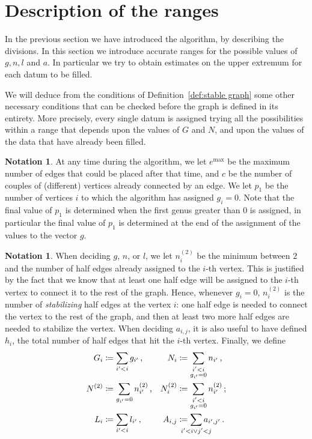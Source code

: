 \documentclass{amsart}
\theoremstyle{plain}
\theoremstyle{definition}
\newtheorem{notation}[theorem]{Notation}
\DeclareMathOperator{\MAX}{max}
\begin{document}
\section{Description of the ranges}\label{sec:ranges}

In the previous section we have introduced the algorithm, by
describing the divisions. In this section we introduce accurate ranges
for the possible values of $g,n,l$ and $a$. In particular we try to
obtain estimates on the upper extremum for each datum to be filled.

We will deduce from the
conditions of Definition~\ref{def:stable graph} some other necessary
conditions that can be checked before the graph is defined in its
entirety. More precisely, every single datum is assigned trying all
the possibilities within a range that depends upon the values of $G$
and $N$, and upon the values of the data that have already been
filled.


\begin{notation}
  At any time during the algorithm, we let $e^{\MAX}$ be the maximum
  number of edges that could be placed after that time, and $c$ be the
  number of couples of (different) vertices already connected by an
  edge. We let $p_1$ be the number of vertices $i$ to which the
  algorithm has assigned $g_i = 0$. Note that the final value of $p_1$
  is determined when the first genus greater than $0$ is assigned, in
  particular the final value of $p_1$ is determined at the end of the
  assignment of the values to the vector $g$.
\end{notation}

\begin{notation}
  When deciding $g$, $n$, or $l$, we let $n^{(2)}_i$ be the minimum
  between $2$ and the number of half edges already assigned to the
  $i$-th vertex. This is justified by the fact that we know that at
  least one half edge will be assigned to the $i$-th vertex to connect
  it to the rest of the graph. Hence, whenever $g_i = 0$, $n^{(2)}_i$
  is the number of \emph{stabilizing\/} half edges at the vertex $i$:
  one half edge is needed to connect the vertex to the rest of the graph,
  and then at least two more half edges are needed to stabilize the
  vertex. When deciding $a_{i,j}$, it is also useful to have defined
  $h_i$, the total number of half edges that hit the $i$-th
  vertex. Finally, we define
  \begin{align*}
    G_i &\coloneqq \sum_{i^\prime < i} g_{i^\prime}\,\text{,} &
    N_i &\coloneqq \sum_{\substack{i^\prime < i\\g_{i^\prime} = 0}} n_{i^\prime}\,\text{,}\\
    N^{(2)} &\coloneqq \sum_{g_{i^\prime} = 0} n^{(2)}_{i^\prime}\,\text{,} &
    N^{(2)}_i &\coloneqq \sum_{\substack{i^\prime < i\\g_{i^\prime} = 0}} n^{(2)}_{i^\prime}\,\text{;}\\
    L_i &\coloneqq \sum_{i^\prime < i} l_{i^\prime}\,\text{,} &
    A_{i,j} &\coloneqq \sum_{\mathclap{i^\prime < i \vee j^\prime < j}} a_{i^\prime, j^\prime}\,\text{.}
  \end{align*}
\end{notation}
\end{document}
